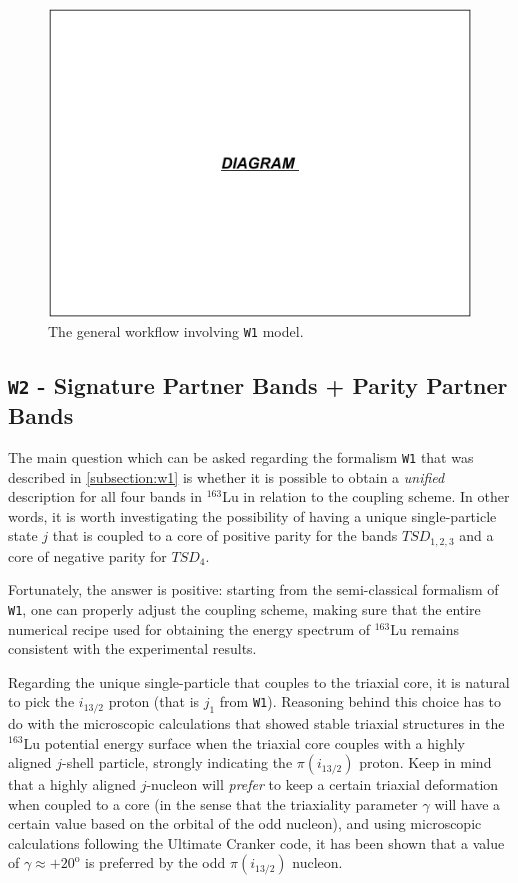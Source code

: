 \documentclass[11pt]{article}
\begin{document}
\begin{figure}
    \centering
    \includegraphics[scale=0.65]{figs/W1_W2_models.pdf}
    \caption{The general workflow involving \texttt{W1} model.}
    \label{w1-model-worfklow}
\end{figure}

\subsection{\texttt{W2} - Signature Partner Bands + Parity Partner Bands}
\label{subsection:w2}

The main question which can be asked regarding the formalism \texttt{W1} that was described in \ref{subsection:w1} is whether it is possible to obtain a \emph{unified} description for all four bands in $^{163}$Lu in relation to the coupling scheme. In other words, it is worth investigating the possibility of having a unique single-particle state $j$ that is coupled to a core of positive parity for the bands $TSD_{1,2,3}$ and a core of negative parity for $TSD_4$.

Fortunately, the answer is positive: starting from the semi-classical formalism of \texttt{W1}, one can properly adjust the coupling scheme, making sure that the entire numerical recipe used for obtaining the energy spectrum of $^{163}$Lu remains consistent with the experimental results.

Regarding the unique single-particle that couples to the triaxial core, it is natural to pick the $i_{13/2}$ proton (that is $j_1$ from \texttt{W1}). Reasoning behind this choice has to do with the microscopic calculations \cite{jensen2002wobbling,hagemann2003quantized,jensen2004coexisting} that showed stable triaxial structures in the $^{163}$Lu potential energy surface when the triaxial core couples with a highly aligned $j$-shell particle, strongly indicating the $\pi(i_{13/2})$ proton. Keep in mind that a highly aligned $j$-nucleon will \emph{prefer} to keep a certain triaxial deformation when coupled to a core \cite{hamamoto1983intrinsic,hamamoto1987rotational,hamamoto2016interplay} (in the sense that the triaxiality parameter $\gamma$ will have a certain value based on the orbital of the odd nucleon), and using microscopic calculations following the Ultimate Cranker code, it has been shown that a value of $\gamma\approx+20^\text{o}$ is preferred by the odd $\pi(i_{13/2})$ nucleon.
\end{document}
